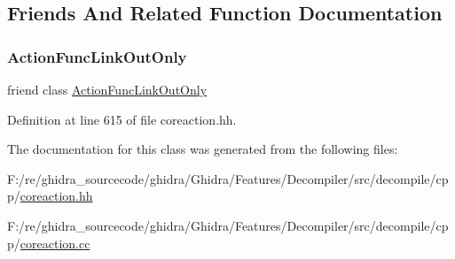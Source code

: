 \subsection{Friends And Related Function Documentation}
\mbox{\label{class_action_func_link_ae931d39a97f0aff12db20f78af1206d2}} 
\subsubsection{\texorpdfstring{ActionFuncLinkOutOnly}{ActionFuncLinkOutOnly}}
{\footnotesize\ttfamily friend class \mbox{\hyperlink{class_action_func_link_out_only}{Action\+Func\+Link\+Out\+Only}}\hspace{0.3cm}{\ttfamily [friend]}}



Definition at line 615 of file coreaction.\+hh.



The documentation for this class was generated from the following files\+:\begin{DoxyCompactItemize}
\item 
F\+:/re/ghidra\+\_\+sourcecode/ghidra/\+Ghidra/\+Features/\+Decompiler/src/decompile/cpp/\mbox{\hyperlink{coreaction_8hh}{coreaction.\+hh}}\item 
F\+:/re/ghidra\+\_\+sourcecode/ghidra/\+Ghidra/\+Features/\+Decompiler/src/decompile/cpp/\mbox{\hyperlink{coreaction_8cc}{coreaction.\+cc}}\end{DoxyCompactItemize}
